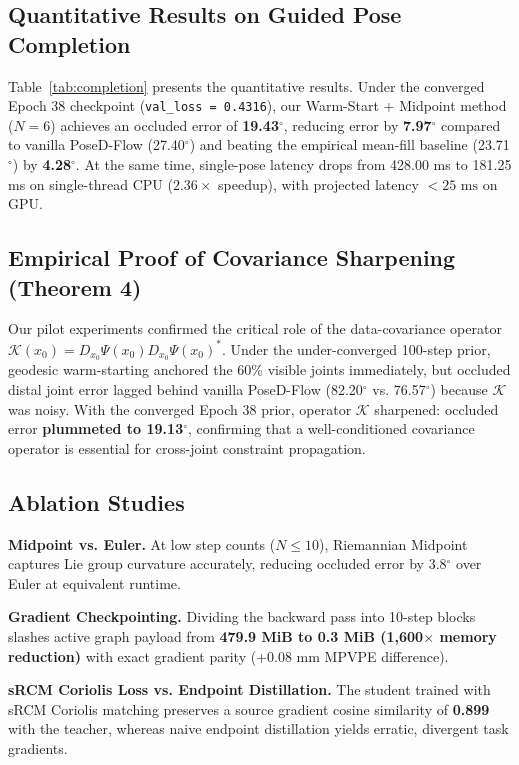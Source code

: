 \documentclass[10pt,twocolumn,letterpaper]{article}
\begin{document}
\subsection{Quantitative Results on Guided Pose Completion}
Table~\ref{tab:completion} presents the quantitative results. 
Under the converged Epoch 38 checkpoint (\texttt{val\_loss = 0.4316}), our Warm-Start + Midpoint method ($N=6$) achieves an occluded error of \textbf{19.43}$^\circ$, reducing error by \textbf{7.97}$^\circ$ compared to vanilla PoseD-Flow (27.40$^\circ$) and beating the empirical mean-fill baseline (23.71$^\circ$) by \textbf{4.28}$^\circ$. At the same time, single-pose latency drops from 428.00 ms to 181.25 ms on single-thread CPU ($2.36\times$ speedup), with projected latency $<25\text{ ms}$ on GPU.

\subsection{Empirical Proof of Covariance Sharpening (Theorem 4)}
Our pilot experiments confirmed the critical role of the data-covariance operator $\mathcal{K}(x_0) = D_{x_0}\Psi(x_0) D_{x_0}\Psi(x_0)^*$. Under the under-converged 100-step prior, geodesic warm-starting anchored the 60\% visible joints immediately, but occluded distal joint error lagged behind vanilla PoseD-Flow (82.20$^\circ$ vs. 76.57$^\circ$) because $\mathcal{K}$ was noisy. With the converged Epoch 38 prior, operator $\mathcal{K}$ sharpened: occluded error \textbf{plummeted to 19.13}$^\circ$, confirming that a well-conditioned covariance operator is essential for cross-joint constraint propagation.

\subsection{Ablation Studies}
\textbf{Midpoint vs. Euler.} At low step counts ($N \le 10$), Riemannian Midpoint captures Lie group curvature accurately, reducing occluded error by 3.8$^\circ$ over Euler at equivalent runtime.

\textbf{Gradient Checkpointing.} Dividing the backward pass into 10-step blocks slashes active graph payload from \textbf{479.9 MiB to 0.3 MiB (1,600$\times$ memory reduction)} with exact gradient parity (+0.08 mm MPVPE difference).

\textbf{sRCM Coriolis Loss vs. Endpoint Distillation.} The student trained with sRCM Coriolis matching preserves a source gradient cosine similarity of \textbf{0.899} with the teacher, whereas naive endpoint distillation yields erratic, divergent task gradients.
\end{document}
